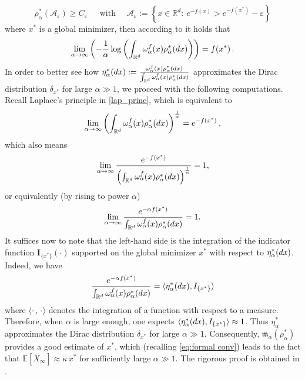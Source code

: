 \documentclass[12pt]{amsart}
\newcommand{\dx}{{\rm d} x}
\newcommand{\RR}{{\mathbb R}}
\newcommand{\EE}{{\mathbb E}}
\newcommand{\OX}{{\overline{X}}}
\newcommand{\mc}[1]{\mathcal{#1}}
\newcommand{\la}{\langle}
\newcommand{\ra}{\rangle}
\numberwithin{equation}{section}
\begin{document}
\begin{equation*}
    \rho_\alpha^*(\mc A_\varepsilon)\geq C_\varepsilon\, \quad \text{ with } \quad \mc A_\varepsilon:=\left\{x\in\RR^d:~e^{-f(x)}>e^{-f(x^*)}-\varepsilon \right\}
\end{equation*}
where $x^{*}$ is a global minimizer, then according to  \cite[Lemma A.3]{huang2024consensus} it holds that
\begin{equation}\label{lap_princ}
	\lim\limits_{\alpha\to\infty}\left(-\frac{1}{\alpha}\log\left(\int_{ \RR^d }\omega_\alpha^f(x)\rho_\alpha^*(\dx)\right)\right)= f(x^*)\,.
\end{equation}
In order to better see how  $\eta_\alpha^*(\dx):=\frac{\omega_\alpha^f(x)\rho_\alpha^*(\dx)}{\int_{ \RR^d }\omega_\alpha^f(x)\rho_\alpha^*(\dx)}$ approximates the Dirac distribution $\delta_{x^*}$ for large $\alpha\gg 1$, we proceed with the following computations. Recall Laplace's principle in \eqref{lap_princ}, which is equivalent to 
\begin{equation*}
    \lim\limits_{\alpha\to\infty}\left(\int_{ \RR^d }\omega_\alpha^f(x)\rho_\alpha^*(\dx)\right)^{\frac{1}{\alpha}}= e^{-f(x^*)}\,,
\end{equation*}
which also means
\begin{equation*}
\begin{aligned}
    \lim\limits_{\alpha\to\infty} \frac{e^{-f(x^*)}}{\left(\int_{ \RR^d }\omega_\alpha^f(x)\rho_\alpha^*(\dx)\right)^{\frac{1}{\alpha}}} = 1,
\end{aligned}
\end{equation*}
or equivalently (by rising to power $\alpha$)
\begin{equation*}
\begin{aligned}
    \lim\limits_{\alpha\to\infty} \frac{e^{-\alpha f(x^*)}}{\int_{ \RR^d }\omega_\alpha^f(x)\rho_\alpha^*(\dx)} = 1.
\end{aligned}
\end{equation*}
It suffices now to note that the left-hand side is the integration of the indicator function $\textbf{I}_{\{x^*\}}(\cdot)$ supported on the global minimizer $x^{*}$ with respect to $\eta_\alpha^*(\dx)$. Indeed, 
we have
\begin{equation*}
    \frac{e^{-\alpha f(x^*)}}{\int_{ \RR^d }\omega_\alpha^f(x)\rho_\alpha^*(\dx)}  = \la \eta_\alpha^*(\dx),\textbf{I}_{\{x^*\}}\ra
\end{equation*}
where $\langle\cdot\,,\,\cdot\rangle$ denotes the integration of a function with respect to a measure. Therefore, when $\alpha$ is large enough, one expects $\la \eta_\alpha^*(\dx),\textbf{I}_{\{x^*\}}\ra \approx 1$. 
Thus $\eta_\alpha^*$ approximates the Dirac distribution $\delta_{x^*}$ for large $\alpha\gg 1$.  Consequently, $\mathfrak{m}_{\alpha}(\rho_\alpha^*)$ provides a good estimate of $x^*$, which (recalling \eqref{eq:formal conv}) leads to the fact that $\EE[\OX_\infty]\approx \kappa\, x^*$ for sufficiently large $\alpha\gg 1$. The rigorous proof is obtained in \cite{huang2025faithful}.
\end{document}
